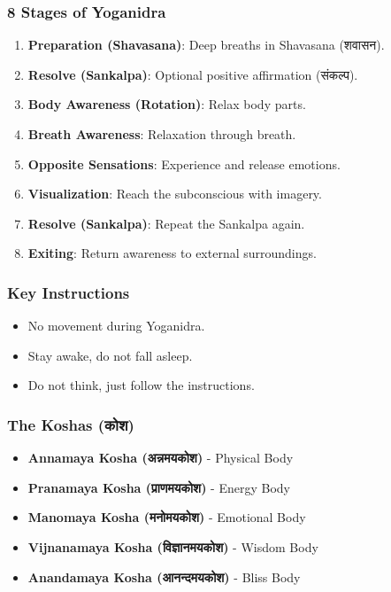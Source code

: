 \begin{frame}[fragile]\frametitle{8 Stages of Yoganidra}
    \begin{enumerate}
        \item \textbf{Preparation (Shavasana)}: Deep breaths in Shavasana (शवासन).
        \item \textbf{Resolve (Sankalpa)}: Optional positive affirmation (संकल्प).
        \item \textbf{Body Awareness (Rotation)}: Relax body parts.
        \item \textbf{Breath Awareness}: Relaxation through breath.
        \item \textbf{Opposite Sensations}: Experience and release emotions.
        \item \textbf{Visualization}: Reach the subconscious with imagery.
        \item \textbf{Resolve (Sankalpa)}: Repeat the Sankalpa again.
        \item \textbf{Exiting}: Return awareness to external surroundings.
    \end{enumerate}
\end{frame}

\begin{frame}[fragile]\frametitle{Key Instructions}
    \begin{itemize}
        \item No movement during Yoganidra.
        \item Stay awake, do not fall asleep.
        \item Do not think, just follow the instructions.
    \end{itemize}
\end{frame}


\begin{frame}[fragile]\frametitle{The Koshas (कोश)}
    \begin{itemize}
        \item \textbf{Annamaya Kosha (अन्नमयकोश)} - Physical Body
        \item \textbf{Pranamaya Kosha (प्राणमयकोश)} - Energy Body
        \item \textbf{Manomaya Kosha (मनोमयकोश)} - Emotional Body
        \item \textbf{Vijnanamaya Kosha (विज्ञानमयकोश)} - Wisdom Body
        \item \textbf{Anandamaya Kosha (आनन्दमयकोश)} - Bliss Body
    \end{itemize}
\end{frame}

